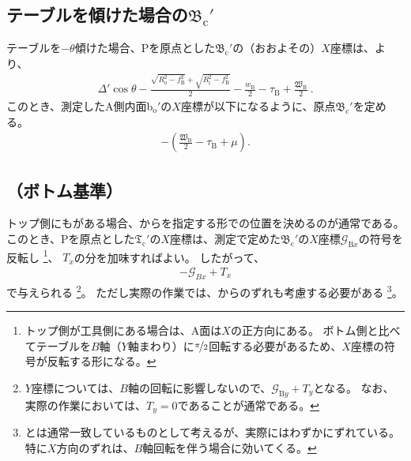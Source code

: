 \subsection[\index{テーブル}テーブルを傾けた場合の\texorpdfstring{$\mathfrak B_\mathrm c'$}{Bc'}]
           {テーブルを傾けた場合の$\boldsymbol{\mathfrak B_\mathrm c'}$}
テーブルを$-\theta$傾けた場合、\TableCenter Pを原点とした\BottomOutcutCenter$\mathfrak B_\mathrm c'$の（おおよその）$X$座標は、より、
\begin{align}
  \label{eq:gaisakucenterBt}
  \Delta'\cos\theta-\frac{\sqrt{R_\mathrm o^2-f_\mathrm B^2}+\sqrt{R_\mathrm i^2-f_\mathrm B^2}}2
  -\frac{w_\mathrm B}2-\tau_\mathrm B+\frac{\mathfrak W_\mathrm B}2\ .
\end{align}
このとき、測定したA側内面b$_\mathrm o'$の$X$座標が以下になるように、原点$\mathfrak B_\mathrm c'$を定める。
\begin{align}
  \label{eq:gaisakucenterBr}
  -\left(\frac{\mathfrak W_\mathrm B}2-\tau_\mathrm B+\mu\right).
\end{align}


\subsection{\TopOutcutCenter（ボトム基準）}
\expandafterindex{\yomiTopOutcut@\nameTopOutcut}トップ側にも\nameOutcut がある場合、\BottomOutcutCenter から\CenterlineEndFaceDif を指定する形で\TopOutcutCenter の位置を決めるのが通常である。
このとき、\TableCenter Pを原点とした\TopOutcutCenter$\mathfrak T_\mathrm c'$の$X$座標は、測定で定めた$\mathfrak B_\mathrm c'$の$X$座標$\mathcal G_{\mathrm Bx}$の符号を反転し
\footnote{トップ側が工具側にある場合は、A面は$X$の正方向にある。
ボトム側と比べてテーブルを$B$軸（$Y$軸まわり）に$\nicefrac\pi2$回転する必要があるため、$X$座標の符号が反転する形になる。}、
\CenterlineEndFaceDifAC$T_x$の分を加味すればよい。
したがって、
\begin{align}
  \label{eq:BbasedTx}
  -\mathcal G_{Bx}+T_x
\end{align}
で与えられる
\footnote{$Y$座標については、$B$軸の回転に影響しないので、$\mathcal G_{\mathrm By}+T_y$となる。
なお、実際の作業においては、$T_y = 0$であることが通常である。}。
ただし実際の作業では、\TableCenter からのずれも考慮する必要がある
\footnote{\TableCenter と\JigCenter は通常一致しているものとして考えるが、実際にはわずかにずれている。
特に$X$方向のずれは、$B$軸回転を伴う場合に効いてくる。}。




